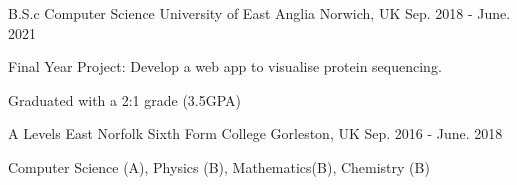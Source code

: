 

\begin{cventries}

    \cventry
    {B.S.c Computer Science} %
    {University of East Anglia} %
    {Norwich, UK} %
    {Sep. 2018 - June. 2021} %
    {
        \begin{cvitems} %
            \item {Final Year Project: Develop a web app to visualise protein sequencing.}
            \item {Graduated with a 2:1 grade (3.5GPA)}
        \end{cvitems}
    }

    \cventry
    {A Levels} %
    {East Norfolk Sixth Form College} %
    {Gorleston, UK} %
    {Sep. 2016 - June. 2018} %
    {
        \begin{cvitems} %
            \item {Computer Science (A), Physics (B), Mathematics(B), Chemistry (B)}
        \end{cvitems}
    }

\end{cventries}
